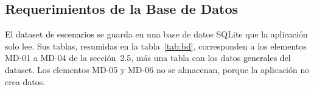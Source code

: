 \subsection{Requerimientos de la Base de Datos}
\providecommand{\bdA}{\dimexpr 0.22\linewidth-2\tabcolsep-1.34\arrayrulewidth\relax}
\providecommand{\bdB}{\dimexpr 0.58\linewidth-2\tabcolsep-1.33\arrayrulewidth\relax}
\providecommand{\bdC}{\dimexpr 0.20\linewidth-2\tabcolsep-1.33\arrayrulewidth\relax}
\textcolor{black}{El dataset de escenarios} se guarda en una base de datos SQLite que la aplicación solo lee. Sus tablas, resumidas en la tabla~\ref{tab:bd}, corresponden a los elementos MD-01 a MD-04 de la sección~2.5, más una tabla con los datos \textcolor{black}{generales del dataset}. Los elementos MD-05 y MD-06 no se almacenan, porque la aplicación no crea datos.

